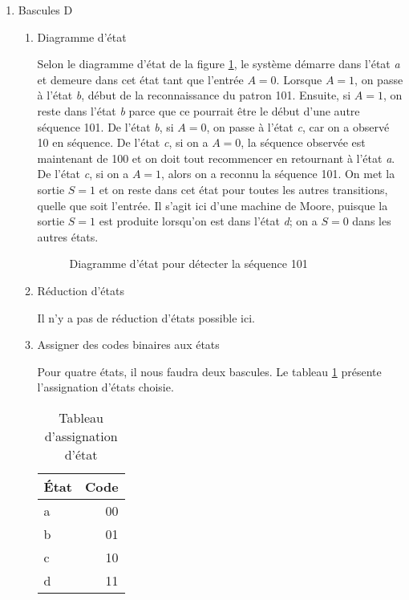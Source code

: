 \documentclass[letter, oneside]{book}
\begin{document}
\begin{enumerate}
\item Bascules D
\label{sec:org2a783f9}

\begin{enumerate}
\item Diagramme d'état
\label{sec:orgf48a224}

Selon le diagramme d'état de la figure \ref{fig:org44344fb}, le
système démarre dans l'état \emph{a} et demeure dans cet état tant que
l'entrée \(A=0\). Lorsque \(A=1\), on passe à l'état \emph{b}, début de la
reconnaissance du patron 101. Ensuite, si \(A=1\), on reste dans
l'état \emph{b} parce que ce pourrait être le début d'une autre
séquence 101. De l'état \emph{b}, si \(A=0\), on passe à l'état \emph{c}, car on
a observé 10 en séquence. De l'état \emph{c}, si on a \(A=0\), la séquence
observée est maintenant de 100 et on doit tout recommencer en
retournant à l'état \emph{a}.  De l'état \emph{c}, si on a \(A=1\), alors on a
reconnu la séquence 101. On met la sortie \(S=1\) et on reste dans cet
état pour toutes les autres transitions, quelle que soit l'entrée. Il
s'agit ici d'une machine de Moore, puisque la sortie \(S=1\) est
produite lorsqu'on est dans l'état \emph{d}; on a \(S=0\) dans les autres
états.

\begin{figure}[htbp]
\centering

\caption{\label{fig:org44344fb}Diagramme d'état pour détecter la séquence 101}
\end{figure}


\item Réduction d'états
\label{sec:org6c362e0}

Il n'y a pas de réduction d'états possible ici.

\item Assigner des codes binaires aux états
\label{sec:org3ebfcaf}

Pour quatre états, il nous faudra deux bascules.  Le tableau
   \ref{tab:orgb0f2c93} présente l'assignation d'états choisie.

\begin{table}[htbp]
\caption{\label{tab:orgb0f2c93}Tableau d'assignation d'état}
\centering
\begin{tabular}{lr}
État & Code\\[0pt]
\hline
a & 00\\[0pt]
b & 01\\[0pt]
c & 10\\[0pt]
d & 11\\[0pt]
\end{tabular}
\end{table}



\end{enumerate}
\end{enumerate}
\end{document}
